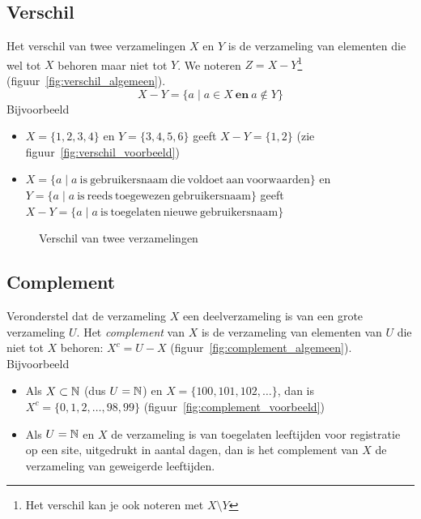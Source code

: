 \subsection{Verschil}
Het verschil van twee verzamelingen $X$ en $Y$ is de verzameling van elementen die wel tot $X$ behoren maar niet tot $Y$. We noteren $Z=X-Y$\footnote{Het verschil kan je ook noteren met $X\setminus Y$} (figuur~\ref{fig:verschil_algemeen}).
\begin{equation*}
X-Y=\{a\mid a\in X ~\mathbf{en}~a\not \in Y\}
\end{equation*}
Bijvoorbeeld
\begin{itemize}
  \item $X=\{1,2,3,4\}$ en $Y=\{ 3,4,5,6\}$ geeft $X-Y=\{1,2\}$ (zie figuur~\ref{fig:verschil_voorbeeld})
  \item $X=\{a\mid a ~\mathrm{is~gebruikersnaam~die~voldoet~aan~voorwaarden}\}$ en \\$Y=\{a\mid a~\mathrm{is~reeds~toegewezen~gebruikersnaam}\}$ geeft \\
        $X-Y=\{a\mid a~\mathrm{is~toegelaten~nieuwe~gebruikersnaam}\}$
\end{itemize}

\begin{figure}[htbp]
\centering
{}\qquad
\subfloat[$\{1,2,3,4\}-\{ 3,4,5,6\}=\{1,2\}$]{
    
    \label{fig:verschil_voorbeeld}
}
\caption{Verschil van twee verzamelingen}
\end{figure}

\subsection{Complement}
Veronderstel dat de verzameling $X$ een deelverzameling is van een grote verzameling $U$. Het \emph{complement}  van $X$ is de verzameling van elementen van $U$ die niet tot $X$ behoren: $X^c=U-X$ (figuur~\ref{fig:complement_algemeen}). Bijvoorbeeld
\begin{itemize}
\item Als $X\subset \mathbb{N}$ (dus $U=\mathbb{N}$) en $X=\{100,101,102,\dots\}$, dan is $X^c=\{0,1,2,\dots,98,99\}$ (figuur~\ref{fig:complement_voorbeeld})
\item Als $U=\mathbb{N}$ en $X$ de verzameling is van toegelaten leeftijden voor registratie op een site, uitgedrukt in aantal dagen, dan is het complement van $X$ de verzameling van geweigerde leeftijden.
\end{itemize}

